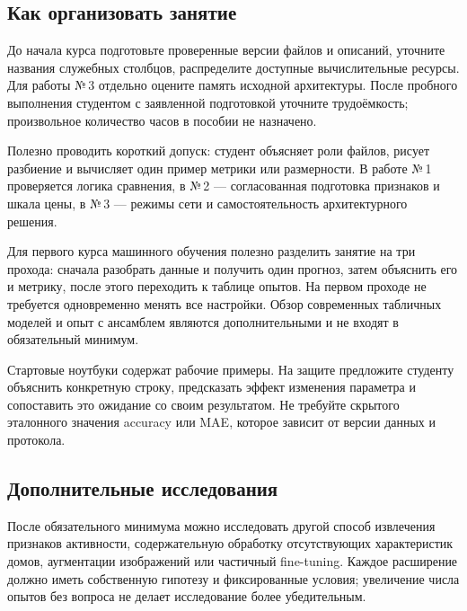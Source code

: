 \subsection*{Как организовать занятие}
До начала курса подготовьте проверенные версии файлов и описаний, уточните названия служебных столбцов, распределите доступные вычислительные ресурсы. Для работы №\,3 отдельно оцените память исходной архитектуры. После пробного выполнения студентом с заявленной подготовкой уточните трудоёмкость; произвольное количество часов в пособии не назначено.

Полезно проводить короткий допуск: студент объясняет роли файлов, рисует разбиение и вычисляет один пример метрики или размерности. В работе №\,1 проверяется логика сравнения, в №\,2 --- согласованная подготовка признаков и шкала цены, в №\,3 --- режимы сети и самостоятельность архитектурного решения.

Для первого курса машинного обучения полезно разделить занятие на три прохода: сначала разобрать данные и получить один прогноз, затем объяснить его и метрику, после этого переходить к таблице опытов. На первом проходе не требуется одновременно менять все настройки. Обзор современных табличных моделей и опыт с ансамблем являются дополнительными и не входят в обязательный минимум.

Стартовые ноутбуки содержат рабочие примеры. На защите предложите студенту объяснить конкретную строку, предсказать эффект изменения параметра и сопоставить это ожидание со своим результатом. Не требуйте скрытого эталонного значения accuracy или MAE, которое зависит от версии данных и протокола.

\subsection*{Дополнительные исследования}
После обязательного минимума можно исследовать другой способ извлечения признаков активности, содержательную обработку отсутствующих характеристик домов, аугментации изображений или частичный fine-tuning. Каждое расширение должно иметь собственную гипотезу и фиксированные условия; увеличение числа опытов без вопроса не делает исследование более убедительным.
